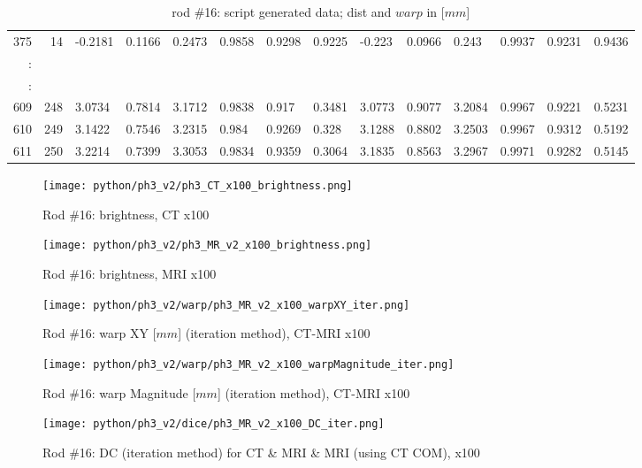 \begin{table}[p]
{\begin{minipage}{\textheight}
\begin{tabular}{rr||lll|lll||lll|lll}
375    & 14   & -0.2181 & 0.1166  & 0.2473 & 0.9858 & 0.9298 & 0.9225 & -0.223  & 0.0966  & 0.243  & 0.9937 & 0.9231 & 0.9436 \\
:      &      &         &         &        &        &        &        &         &         &        &        &        &        \\
\hline
:      &      &         &         &        &        &        &        &         &         &        &        &        &        \\
609    & 248  & 3.0734  & 0.7814  & 3.1712 & 0.9838 & 0.917  & 0.3481 & 3.0773  & 0.9077  & 3.2084 & 0.9967 & 0.9221 & 0.5231 \\
610    & 249  & 3.1422  & 0.7546  & 3.2315 & 0.984  & 0.9269 & 0.328  & 3.1288  & 0.8802  & 3.2503 & 0.9967 & 0.9312 & 0.5192 \\
611    & 250  & 3.2214  & 0.7399  & 3.3053 & 0.9834 & 0.9359 & 0.3064 & 3.1835  & 0.8563  & 3.2967 & 0.9971 & 0.9282 & 0.5145
\end{tabular}
       \caption{rod \#16: script generated data; dist and $warp$ in [$mm$]}
       \label{tab:spit-out-16}
     \end{minipage}
   }
 \end{table}

\begin{figure}[!thb]
    \centering
    \texttt{[image: python/ph3\_v2/ph3\_CT\_x100\_brightness.png]}
    \caption{Rod \#16: brightness, CT x100}
    \label{fig:ph3_CT_x100_brightness}
\end{figure}

\begin{figure}[!tbh]
    \centering
    \texttt{[image: python/ph3\_v2/ph3\_MR\_v2\_x100\_brightness.png]}
    \caption{Rod \#16: brightness, MRI x100}
    \label{fig:ph3_MR_x100_brightness}
\end{figure}


\begin{figure}[!hbt]
  \centering
  \texttt{[image: python/ph3\_v2/warp/ph3\_MR\_v2\_x100\_warpXY\_iter.png]}
  \caption{Rod \#16: warp XY [$mm$] (iteration method), CT-MRI x100}
  \label{fig:ph3_warpXY_x100}
\end{figure}

\begin{figure}[!htb]
    \centering
    \texttt{[image: python/ph3\_v2/warp/ph3\_MR\_v2\_x100\_warpMagnitude\_iter.png]}
    \caption{Rod \#16: warp Magnitude [$mm$] (iteration method), CT-MRI x100}
    \label{fig:ph3_warpMagnitude_x100}
\end{figure}

\begin{figure}[!htb]
     \centering
     \texttt{[image: python/ph3\_v2/dice/ph3\_MR\_v2\_x100\_DC\_iter.png]}
     \caption{Rod \#16: DC (iteration method) for CT \& MRI \& MRI (using CT COM), x100}
     \label{fig:ph3_DC_x100}
\end{figure}



\cleardoublepage